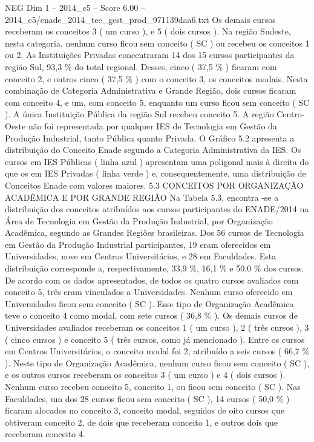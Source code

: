 \begin{textsample}{NEG Dim 1 – 2014\_c5 – Score 6.00 – 2014\_c5/enade\_2014\_tec\_gest\_prod\_971139daa6.txt}
Os demais cursos receberam os conceitos 3 ( um curso ), e 5 ( dois cursos ).
Na região Sudeste, nesta categoria, nenhum curso ficou sem conceito ( SC ) ou recebeu os conceitos 1 ou 2.
As Instituições Privadas concentraram 14 dos 15 cursos participantes da região Sul, 93,3 \% do total regional.
Desses, cinco ( 37,5 \% ) ficaram com conceito 2, e outros cinco ( 37,5 \% ) com o conceito 3, os conceitos modais.
Nesta combinação de Categoria Administrativa e Grande Região, dois cursos ficaram com conceito 4, e um, com conceito 5, enquanto um curso ficou sem conceito ( SC ).
A única Instituição Pública da região Sul recebeu conceito 5.
A região Centro-Oeste não foi representada por qualquer IES de Tecnologia em Gestão da Produção Industrial, tanto Pública quanto Privada.
O Gráfico 5.2 apresenta a distribuição do Conceito Enade segundo a Categoria Administrativa da IES.
Os cursos em IES Públicas ( linha azul ) apresentam uma poligonal mais à direita do que os em IES Privadas ( linha verde ) e, consequentemente, uma distribuição de Conceitos Enade com valores maiores. 5.3 CONCEITOS POR ORGANIZAÇÃO ACADÊMICA E POR GRANDE REGIÃO Na Tabela 5.3, encontra -se a distribuição dos conceitos atribuídos aos cursos participantes do ENADE/2014 na Área de Tecnologia em Gestão da Produção Industrial, por Organização Acadêmica, segundo as Grandes Regiões brasileiras.
Dos 56 cursos de Tecnologia em Gestão da Produção Industrial participantes, 19 eram oferecidos em Universidades, nove em Centros Universitários, e 28 em Faculdades.
Esta distribuição corresponde a, respectivamente, 33,9 \%, 16,1 \% e 50,0 \% dos cursos.
De acordo com os dados apresentados, de todos os quatro cursos avaliados com conceito 5, três eram vinculados a Universidades.
Nenhum curso oferecido em Universidades ficou sem conceito ( SC ).
Esse tipo de Organização Acadêmica teve o conceito 4 como modal, com sete cursos ( 36,8 \% ).
Os demais cursos de Universidades avaliados receberam os conceitos 1 ( um curso ), 2 ( três cursos ), 3 ( cinco cursos ) e conceito 5 ( três cursos, como já mencionado ).
Entre os cursos em Centros Universitários, o conceito modal foi 2, atribuído a seis cursos ( 66,7 \% ).
Neste tipo de Organização Acadêmica, nenhum curso ficou sem conceito ( SC ), e os outros cursos receberam os conceitos 3 ( um curso ) e 4 ( dois cursos ).
Nenhum curso recebeu conceito 5, conceito 1, ou ficou sem conceito ( SC ).
Nas Faculdades, um dos 28 cursos ficou sem conceito ( SC ), 14 cursos ( 50,0 \% ) ficaram alocados no conceito 3, conceito modal, seguidos de oito cursos que obtiveram conceito 2, de dois que receberam conceito 1, e outros dois que receberam conceito 4.

\end{textsample}
